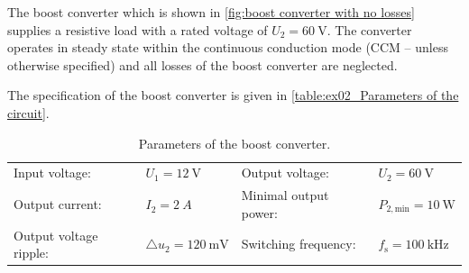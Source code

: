 
The boost converter which is shown in \autoref{fig:boost converter with no losses} supplies a resistive load with a rated voltage of $U_{\mathrm{2}} = \SI{60}{\volt}$. The converter operates in steady state within the continuous conduction mode (CCM -- unless otherwise specified) and all losses of the boost converter are neglected.



The specification of the boost converter is given in \autoref{table:ex02_Parameters of the circuit}.

\begin{table}[ht]
	\centering  %
	\begin{tabular}{llll}
		\toprule

		Input voltage:         & $U_{\mathrm{1}} = \SI{12}{\volt}$                  & Output voltage:       & $U_{\mathrm{2}} = \SI{60}{\volt}$        \\
		Output current:        & $I_2 = \SI{2}{A}$                                  & Minimal output power: & $P_{\mathrm{2,min}} = \SI{10}{\watt}$    \\
		Output voltage ripple: & $\triangle u_{\mathrm{2}} = \SI{120}{\milli\volt}$ & Switching frequency:  & $f_{\mathrm{s}} = \SI{100}{\kilo\hertz}$ \\
		\bottomrule
	\end{tabular}
	\caption{Parameters of the boost converter.}  %
	\label{table:ex02_Parameters of the circuit}
\end{table}
%


